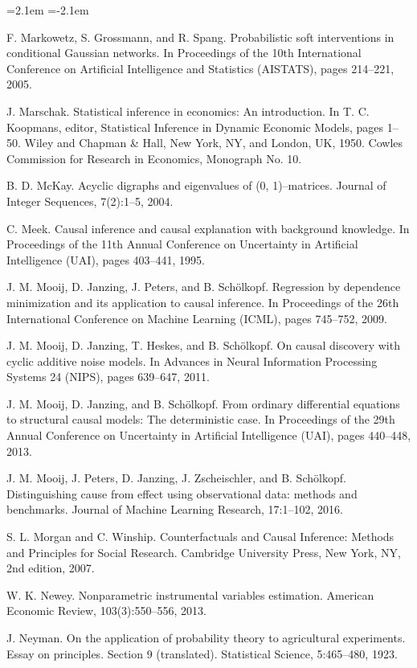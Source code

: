 \begin{list}{}{\leftmargin=2.1em
 \itemindent=-2.1em\parsep=0pt\itemsep=3pt}
\item F. Markowetz, S. Grossmann, and R. Spang. Probabilistic soft interventions in conditional Gaussian networks. In Proceedings of the 10th International Conference on Artificial Intelligence and Statistics (AISTATS), pages 214--221, 2005.
\item J. Marschak. Statistical inference in economics: An introduction. In T. C. Koopmans, editor, Statistical Inference in Dynamic Economic Models, pages 1--50. Wiley and Chapman \& Hall, New York, NY, and London, UK, 1950. Cowles Commission for Research in Economics, Monograph No. 10.
\item B. D. McKay. Acyclic digraphs and eigenvalues of (0, 1)--matrices. Journal of Integer Sequences, 7(2):1--5, 2004.
\item C. Meek. Causal inference and causal explanation with background knowledge. In Proceedings of the 11th Annual Conference on Uncertainty in Artificial Intelligence (UAI), pages 403--441, 1995.
\item J. M. Mooij, D. Janzing, J. Peters, and B. Schölkopf. Regression by dependence minimization and its application to causal inference. In Proceedings of the 26th International Conference on Machine Learning (ICML), pages 745--752, 2009.
\item J. M. Mooij, D. Janzing, T. Heskes, and B. Schölkopf. On causal discovery with cyclic additive noise models. In Advances in Neural Information Processing Systems 24 (NIPS), pages 639--647, 2011.
\item J. M. Mooij, D. Janzing, and B. Schölkopf. From ordinary differential equations to structural causal models: The deterministic case. In Proceedings of the 29th Annual Conference on Uncertainty in Artificial Intelligence (UAI), pages 440--448, 2013.
\item J. M. Mooij, J. Peters, D. Janzing, J. Zscheischler, and B. Schölkopf. Distinguishing cause from effect using observational data: methods and benchmarks. Journal of Machine Learning Research, 17:1--102, 2016.
\item S. L. Morgan and C. Winship. Counterfactuals and Causal Inference: Methods and Principles for Social Research. Cambridge University Press, New York, NY, 2nd edition, 2007.
\item W. K. Newey. Nonparametric instrumental variables estimation. American Economic Review, 103(3):550--556, 2013.
\item J. Neyman. On the application of probability theory to agricultural experiments. Essay on principles. Section 9 (translated). Statistical Science, 5:465--480, 1923.

\end{list}
